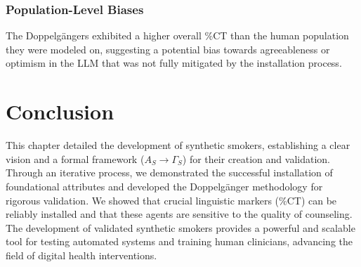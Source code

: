 \subsubsection{Population-Level Biases}

The Doppelgängers exhibited a higher overall \%CT than the human population they were modeled on, suggesting a potential bias towards agreeableness or optimism in the LLM that was not fully mitigated by the installation process.

\section{Conclusion}

This chapter detailed the development of synthetic smokers, establishing a clear vision and a formal framework ($A_S \rightarrow \Gamma_S$) for their creation and validation. Through an iterative process, we demonstrated the successful installation of foundational attributes and developed the Doppelgänger methodology for rigorous validation. We showed that crucial linguistic markers (\%CT) can be reliably installed and that these agents are sensitive to the quality of counseling. The development of validated synthetic smokers provides a powerful and scalable tool for testing automated systems and training human clinicians, advancing the field of digital health interventions.